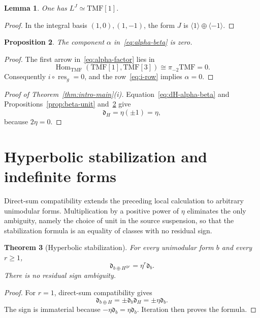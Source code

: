 \documentclass[11pt,a4paper]{amsart}
\newcommand{\TMF}{\mathrm{TMF}}
\newcommand{\Hom}{\operatorname{Hom}}
\newcommand{\res}{\operatorname{res}}
\newcommand{\dclass}{\mathfrak d}
\theoremstyle{plain}
\newtheorem{theorem}{Theorem}[section]
\newtheorem{proposition}[theorem]{Proposition}
\newtheorem{lemma}[theorem]{Lemma}
\theoremstyle{definition}
\theoremstyle{remark}
\begin{document}
\begin{lemma}\label{lem:J-shift}
One has $L^J\simeq\TMF[1]$.
\end{lemma}

\begin{proof}
In the integral basis $(1,0),(1,-1)$, the form $J$ is
$\langle1\rangle\oplus\langle-1\rangle$.
\end{proof}

\begin{proposition}\label{prop:alpha-zero}
The component $\alpha$ in~\eqref{eq:alpha-beta} is zero.
\end{proposition}

\begin{proof}
The first arrow in~\eqref{eq:alpha-factor} lies in
\[
 \Hom_{\TMF}(\TMF[1],\TMF[3])
 \cong\pi_{-2}\TMF=0.
\]
Consequently $i\circ\res_g=0$, and the row~\eqref{eq:i-row}
implies $\alpha=0$.
\end{proof}

\begin{proof}[Proof of Theorem~\ref{thm:intro-main}\textup{(i)}]
Equation~\eqref{eq:dH-alpha-beta} and
Propositions~\ref{prop:beta-unit} and~\ref{prop:alpha-zero} give
\[
 \dclass_H=\eta(\pm1)=\eta,
\]
because $2\eta=0$.
\end{proof}

\section{Hyperbolic stabilization and indefinite forms}\label{sec:stabilization}

Direct-sum compatibility extends the preceding local calculation to
arbitrary unimodular forms. Multiplication by a positive power of $\eta$
eliminates the only ambiguity, namely the choice of unit in the source
suspension, so that the stabilization formula is an equality of classes
with no residual sign.

\begin{theorem}[Hyperbolic stabilization]\label{thm:stabilization}
For every unimodular form $b$ and every $r\ge1$,
\begin{equation}\label{eq:stabilization}
 \boxed{\dclass_{b\oplus H^{\oplus r}}=\eta^r\dclass_b.}
\end{equation}
There is no residual sign ambiguity.
\end{theorem}

\begin{proof}
For $r=1$, direct-sum compatibility gives
\[
 \dclass_{b\oplus H}=\pm\dclass_b\dclass_H=\pm\eta\dclass_b.
\]
The sign is immaterial because $-\eta\dclass_b=\eta\dclass_b$.
Iteration then proves the formula.
\end{proof}
\end{document}
